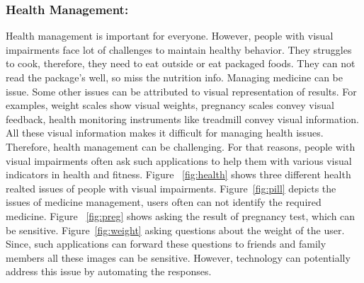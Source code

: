 \documentclass[sigconf]{acmart}
\begin{document}
\subsubsection{Health Management:} Health management is important for everyone. However, people with visual impairments face lot of challenges to maintain healthy behavior. They struggles to cook, therefore, they need to eat outside or eat packaged foods. They can not read the package's well, so miss the nutrition info. Managing medicine can be issue. Some other issues can be attributed to visual representation of results. For examples, weight scales show visual weights, pregnancy scales convey visual feedback, health monitoring instruments like treadmill convey visual information. All these visual information makes it difficult for managing health issues. Therefore, health management can be challenging. For that reasons, people with visual impairments often ask such applications to help them with various visual indicators in health and fitness. Figure ~\ref{fig:health} shows three different health realted issues of people with visual impairments. Figure~\ref{fig:pill} depicts the issues of medicine management, users often can not identify the required medicine. Figure ~\ref{fig:preg} shows asking the result of pregnancy test, which can be sensitive. Figure~\ref{fig:weight} asking questions about the weight of the user. Since, such applications can forward these questions to friends and family members all these images can be sensitive. However, technology can potentially address this issue by automating the responses.
\end{document}
